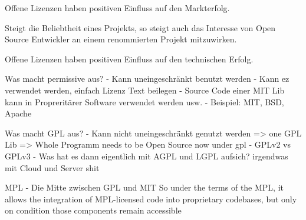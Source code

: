 \begin{hypothesis}
    Offene Lizenzen haben positiven Einfluss auf den Markterfolg.
    \label{H:1}
\end{hypothesis}

\noindent
Steigt die Beliebtheit eines Projekts, so steigt auch das Interesse von Open Source Entwickler an
einem renommierten Projekt mitzuwirken.

\begin{hypothesis}
    Offene Lizenzen haben positiven Einfluss auf den technischen Erfolg.
\end{hypothesis}



Was macht permissive aus?
- Kann uneingeschränkt benutzt werden
- Kann ez verwendet werden, einfach Lizenz Text beilegen
- Source Code einer MIT Lib kann in Propreritärer Software verwendet werden usw.
- Beispiel: MIT, BSD, Apache

Was macht GPL aus?
- Kann nicht uneingeschränkt genutzt werden => one GPL Lib => Whole Programm needs to be Open Source now under gpl
- GPLv2 vs GPLv3
- Was hat es dann eigentlich mit AGPL und LGPL aufsich? irgendwas mit Cloud und Server shit

MPL
- Die Mitte zwischen GPL und MIT
So under the terms of the MPL, it allows the integration of MPL-licensed code into proprietary codebases,
but only on condition those components remain accessible

